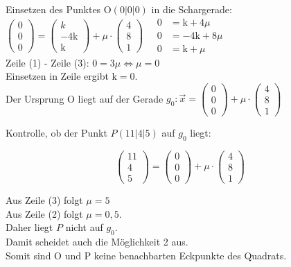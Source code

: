 \documentclass[10pt]{article}
\begin{document}
Einsetzen des Punktes $\mathrm{O}(0|0| 0)$ in die Schargerade:\\
$\left(\begin{array}{l}0 \\ 0 \\ 0\end{array}\right)=\left(\begin{array}{c}k \\ -4 \mathrm{k} \\ \mathrm{k}\end{array}\right)+\mu \cdot\left(\begin{array}{l}4 \\ 8 \\ 1\end{array}\right) \quad \begin{aligned} 0 & =\mathrm{k}+4 \mu \\ 0 & =-4 \mathrm{k}+8 \mu \\ 0 & =\mathrm{k}+\mu\end{aligned}$\\
Zeile (1) - Zeile (3): $0=3 \mu \Leftrightarrow \mu=0$\\
Einsetzen in Zeile ergibt $\mathrm{k}=0$.\\
Der Ursprung O liegt auf der Gerade $g_{0}: \vec{x}=\left(\begin{array}{l}0 \\ 0 \\ 0\end{array}\right)+\mu \cdot\left(\begin{array}{l}4 \\ 8 \\ 1\end{array}\right)$

Kontrolle, ob der Punkt $P(11|4| 5)$ auf $g_{0}$ liegt:

$$
\left(\begin{array}{l}
11 \\
4 \\
5
\end{array}\right)=\left(\begin{array}{l}
0 \\
0 \\
0
\end{array}\right)+\mu \cdot\left(\begin{array}{l}
4 \\
8 \\
1
\end{array}\right)
$$

Aus Zeile (3) folgt $\mu=5$\\
Aus Zeile (2) folgt $\mu=0,5$.\\
Daher liegt $P$ nicht auf $g_{0}$.\\
Damit scheidet auch die Möglichkeit 2 aus.\\
Somit sind O und P keine benachbarten Eckpunkte des Quadrats.
\end{document}
